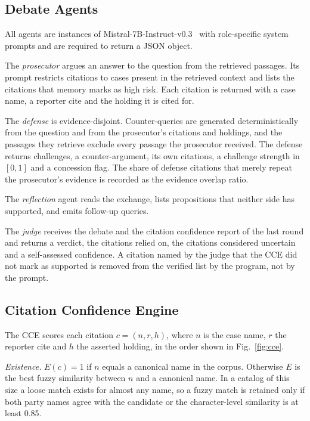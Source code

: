 \documentclass[conference]{IEEEtran}
\begin{document}
\subsection{Debate Agents}
All agents are instances of Mistral-7B-Instruct-v0.3~\cite{mistral7b} with role-specific system prompts and are required to return a JSON object.

The \emph{prosecutor} argues an answer to the question from the retrieved passages. Its prompt restricts citations to cases present in the retrieved context and lists the citations that memory marks as high risk. Each citation is returned with a case name, a reporter cite and the holding it is cited for.

The \emph{defense} is evidence-disjoint. Counter-queries are generated deterministically from the question and from the prosecutor's citations and holdings, and the passages they retrieve exclude every passage the prosecutor received. The defense returns challenges, a counter-argument, its own citations, a challenge strength in $[0,1]$ and a concession flag. The share of defense citations that merely repeat the prosecutor's evidence is recorded as the evidence overlap ratio.

The \emph{reflection} agent reads the exchange, lists propositions that neither side has supported, and emits follow-up queries.

The \emph{judge} receives the debate and the citation confidence report of the last round and returns a verdict, the citations relied on, the citations considered uncertain and a self-assessed confidence. A citation named by the judge that the CCE did not mark as supported is removed from the verified list by the program, not by the prompt.

\subsection{Citation Confidence Engine}\label{sec:cce}
The CCE scores each citation $c = (n, r, h)$, where $n$ is the case name, $r$ the reporter cite and $h$ the asserted holding, in the order shown in Fig.~\ref{fig:cce}.

\emph{Existence.} $E(c) = 1$ if $n$ equals a canonical name in the corpus. Otherwise $E$ is the best fuzzy similarity between $n$ and a canonical name. In a catalog of this size a loose match exists for almost any name, so a fuzzy match is retained only if both party names agree with the candidate or the character-level similarity is at least 0.85.
\end{document}
